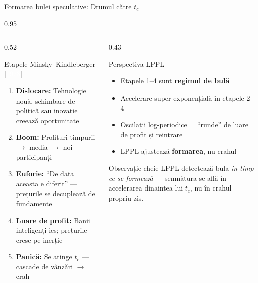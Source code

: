 \documentclass[9pt, aspectratio=169, t]{beamer}
\begin{document}
\begin{frame}{Formarea bulei speculative: Drumul către $t_c$}
    \begin{cminipage}{0.95\textwidth}
    {\footnotesize
    \begin{columns}[T]
        \begin{column}{0.52\textwidth}
            \begin{block}{Etapele Minsky--Kindleberger {\scriptsize[\href{https://doi.org/10.1007/978-1-349-04338-5}{\textcolor{white}{1978}}]}}
                \begin{enumerate}\setlength{\itemsep}{1pt}
                    \item \textbf{Dislocare:} Tehnologie nouă, schimbare de politică sau inovație creează oportunitate
                    \item \textbf{Boom:} Profituri timpurii $\to$ media $\to$ noi participanți
                    \item \textbf{Euforie:} ``De data aceasta e diferit'' --- prețurile se decuplează de fundamente
                    \item \textbf{Luare de profit:} Banii inteligenți ies; prețurile cresc pe inerție
                    \item \textbf{Panică:} Se atinge $t_c$ --- cascade de vânzări $\to$ crah
                \end{enumerate}
            \end{block}
        \end{column}
        \begin{column}{0.43\textwidth}
            \begin{alertblock}{Perspectiva LPPL}
                \begin{itemize}\setlength{\itemsep}{1pt}
                    \item Etapele 1--4 sunt \textbf{regimul de bulă}
                    \item Accelerare super-exponențială în etapele 2--4
                    \item Oscilații log-periodice = ``runde'' de luare de profit și reintrare
                    \item LPPL ajustează \textbf{formarea}, nu crahul
                \end{itemize}
            \end{alertblock}
            \vspace{-1mm}
            \begin{exampleblock}{Observație cheie}
                LPPL detectează bula \textit{în timp ce se formează} --- semnătura se află în accelerarea dinaintea lui $t_c$, nu în crahul propriu-zis.
            \end{exampleblock}
        \end{column}
    \end{columns}
    }
    \end{cminipage}
\end{frame}
\end{document}
